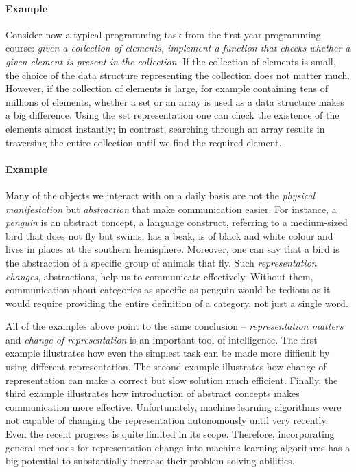 \paragraph{Example} Consider now a typical programming task from the first-year programming course: \textit{given a collection of elements, implement a function that checks whether a given element is present in the collection}.
If the collection of elements is small, the choice of the data structure representing the collection does not matter much.
However, if the collection of elements is large, for example containing tens of millions of elements, whether a set or an array is used as a data structure makes a big difference.
Using the set representation one can check the existence of the elements almost instantly; in contrast, searching through an array results in traversing the entire collection until we find the required element.



\paragraph{Example}
Many of the objects we interact with on a daily basis are not the \textit{physical manifestation} but \textit{abstraction} that make communication easier.
For instance, a \textit{penguin} is an abstract concept, a language construct, referring to a medium-sized bird that does not fly but swims, has a beak, is of black and white colour and lives in places at the southern hemisphere.
Moreover, one can say that a bird is the abstraction of a specific group of animals that fly.
Such \textit{representation changes}, abstractions, help us to communicate effectively.
Without them, communication about categories as specific as penguin would be tedious as it would  require providing the entire definition of a category, not just a single word.




All of the examples above point to the same conclusion -- \textit{representation matters} and \textit{change of representation} is an important tool of intelligence.
The first example illustrates how even the simplest task can be made more difficult by using different representation.
The second example illustrates how change of representation can make a correct but slow solution much efficient.
Finally, the third example illustrates how introduction of abstract concepts makes communication more effective.
Unfortunately, machine learning algorithms were not capable of changing the representation autonomously until very recently.
Even the recent progress is quite limited in its scope.
Therefore, incorporating general methods for representation change into machine learning algorithms has a big potential to substantially increase their problem solving abilities.






